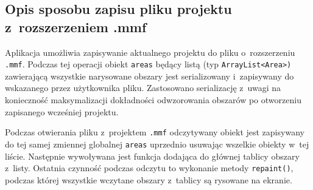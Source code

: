 \subsection{Opis sposobu zapisu pliku projektu z~rozszerzeniem .mmf}

Aplikacja umożliwia zapisywanie aktualnego projektu do pliku o~rozszerzeniu \texttt{.mmf}. Podczas tej operacji obiekt \texttt{areas} będący listą (typ \texttt{ArrayList<Area>)} zawierającą wszystkie narysowane obszary jest serializowany i~zapisywany do wskazanego przez użytkownika pliku. Zastosowano serializację z~uwagi na konieczność maksymalizacji dokładności odwzorowania obszarów po otworzeniu zapisanego wcześniej projektu.

Podczas otwierania pliku z~projektem \texttt{.mmf} odczytywany obiekt jest zapisywany do tej samej zmiennej globalnej \texttt{areas} uprzednio usuwając wszelkie obiekty w~tej liście. Następnie wywoływana jest funkcja dodająca do głównej tablicy obszary z~listy. Ostatnia czynność podczas odczytu to wykonanie metody \texttt{repaint()}, podczas której wszystkie wczytane obszary z~tablicy są rysowane na ekranie.
